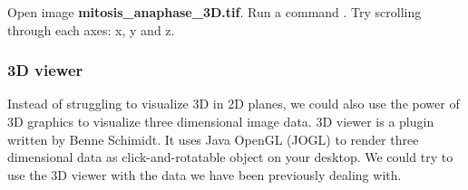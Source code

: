 \begin{indentexercise}{3}
Open image \textbf{mitosis\_anaphase\_3D.tif}.
Run a command . Try scrolling through each axes: x, y and z. 
\end{indentexercise}

\subsubsection{3D viewer}

Instead of struggling to visualize 3D in 2D planes, we could also use the power of 3D graphics to visualize three dimensional image data. 3D viewer is a plugin written by Benne Schimidt. It uses Java OpenGL (JOGL) to render three dimensional data as click-and-rotatable object on your desktop. We could try to use the 3D viewer with the data we have been previously dealing with. 

